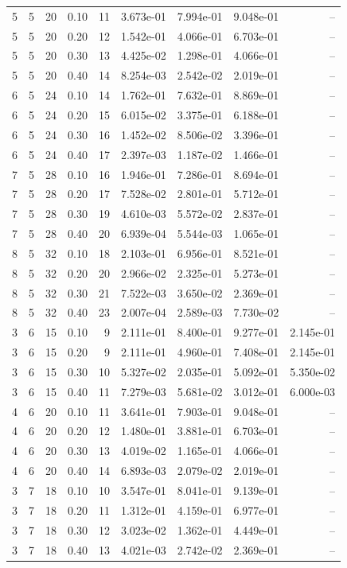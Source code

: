\begin{landscape}
\begin{longtable}{rrrrrrrrr}
5 & 5 & 20 & 0.10 & 11 & 3.673e-01 & 7.994e-01 & 9.048e-01 & -- \\
5 & 5 & 20 & 0.20 & 12 & 1.542e-01 & 4.066e-01 & 6.703e-01 & -- \\
5 & 5 & 20 & 0.30 & 13 & 4.425e-02 & 1.298e-01 & 4.066e-01 & -- \\
5 & 5 & 20 & 0.40 & 14 & 8.254e-03 & 2.542e-02 & 2.019e-01 & -- \\
6 & 5 & 24 & 0.10 & 14 & 1.762e-01 & 7.632e-01 & 8.869e-01 & -- \\
6 & 5 & 24 & 0.20 & 15 & 6.015e-02 & 3.375e-01 & 6.188e-01 & -- \\
6 & 5 & 24 & 0.30 & 16 & 1.452e-02 & 8.506e-02 & 3.396e-01 & -- \\
6 & 5 & 24 & 0.40 & 17 & 2.397e-03 & 1.187e-02 & 1.466e-01 & -- \\
7 & 5 & 28 & 0.10 & 16 & 1.946e-01 & 7.286e-01 & 8.694e-01 & -- \\
7 & 5 & 28 & 0.20 & 17 & 7.528e-02 & 2.801e-01 & 5.712e-01 & -- \\
7 & 5 & 28 & 0.30 & 19 & 4.610e-03 & 5.572e-02 & 2.837e-01 & -- \\
7 & 5 & 28 & 0.40 & 20 & 6.939e-04 & 5.544e-03 & 1.065e-01 & -- \\
8 & 5 & 32 & 0.10 & 18 & 2.103e-01 & 6.956e-01 & 8.521e-01 & -- \\
8 & 5 & 32 & 0.20 & 20 & 2.966e-02 & 2.325e-01 & 5.273e-01 & -- \\
8 & 5 & 32 & 0.30 & 21 & 7.522e-03 & 3.650e-02 & 2.369e-01 & -- \\
8 & 5 & 32 & 0.40 & 23 & 2.007e-04 & 2.589e-03 & 7.730e-02 & -- \\
3 & 6 & 15 & 0.10 & 9 & 2.111e-01 & 8.400e-01 & 9.277e-01 & 2.145e-01 \\
3 & 6 & 15 & 0.20 & 9 & 2.111e-01 & 4.960e-01 & 7.408e-01 & 2.145e-01 \\
3 & 6 & 15 & 0.30 & 10 & 5.327e-02 & 2.035e-01 & 5.092e-01 & 5.350e-02 \\
3 & 6 & 15 & 0.40 & 11 & 7.279e-03 & 5.681e-02 & 3.012e-01 & 6.000e-03 \\
4 & 6 & 20 & 0.10 & 11 & 3.641e-01 & 7.903e-01 & 9.048e-01 & -- \\
4 & 6 & 20 & 0.20 & 12 & 1.480e-01 & 3.881e-01 & 6.703e-01 & -- \\
4 & 6 & 20 & 0.30 & 13 & 4.019e-02 & 1.165e-01 & 4.066e-01 & -- \\
4 & 6 & 20 & 0.40 & 14 & 6.893e-03 & 2.079e-02 & 2.019e-01 & -- \\
3 & 7 & 18 & 0.10 & 10 & 3.547e-01 & 8.041e-01 & 9.139e-01 & -- \\
3 & 7 & 18 & 0.20 & 11 & 1.312e-01 & 4.159e-01 & 6.977e-01 & -- \\
3 & 7 & 18 & 0.30 & 12 & 3.023e-02 & 1.362e-01 & 4.449e-01 & -- \\
3 & 7 & 18 & 0.40 & 13 & 4.021e-03 & 2.742e-02 & 2.369e-01 & -- \\
\end{longtable}
\end{landscape}
